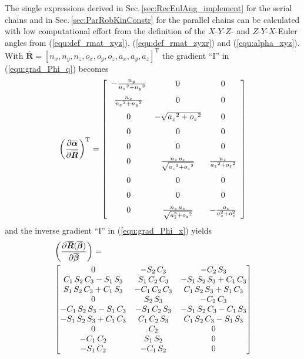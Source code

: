 \documentclass[twocolumn,10pt]{IFTOMM}
\newcommand{\bm}[1]{\boldsymbol{#1}}
\newcommand{\transp}[0]{{\mathrm{T}}}
\begin{document}
The single expressions derived in Sec.\,\ref{sec:RecEulAng_implement} for the serial chains and in Sec.\,\ref{sec:ParRobKinConstr} for the parallel chains can be calculated with low computational effort from the definition of the $X$-$Y$-$Z$- and $Z$-$Y$-$X$-Euler angles from (\ref{equ:def_rmat_xyz}), (\ref{equ:def_rmat_zyxr}) and (\ref{equ:alpha_xyz}).
With $\overline{\bm{R}}=[n_x,n_y,n_z ,o_x,o_y,o_z,a_x,a_y,a_z]^\transp$ the gradient ``I'' in (\ref{equ:grad_Phi_q}) becomes
\begin{equation}
\left(\frac{\partial \overline{\bm{\alpha}}}{\partial \overline{\bm{R}}}\right)^\transp
=
 \left[ \begin {array}{ccc} -{\frac {{n_y}}{{{n_x}}^{2}+{{n_y }}^{2}}}&0&0\\ \noalign{\medskip}{\frac {{n_x}}{{{n_x}}^{2}+{{ n_y}}^{2}}}&0&0\\ \noalign{\medskip}0&-\sqrt {{{a_z}}^{2}+{{ o_z}}^{2}}&0\\ \noalign{\medskip}0&0&0\\ \noalign{\medskip}0&0&0 \\ \noalign{\medskip}0&{\frac {{n_z}\,{o_z}}{\sqrt {{{a_z}}^{ 2}+{{o_z}}^{2}}}}&{\frac {{a_z}}{{{a_z}}^{2}+{{o_z}}^{2}}} \\ \noalign{\medskip}0&0&0\\ \noalign{\medskip}0&0&0 \\ \noalign{\medskip}0&{\frac {{n_z}\,{a_z}}{\sqrt {a_z^{2}+{{o_z}}^{2}}}}&-{\frac {o_z}{a_z^{2}+o_z^{2}} }\end {array} \right] 
\end{equation}
%
and the inverse gradient ``I'' in (\ref{equ:grad_Phi_x}) yields
%
\begin{align}
&\left(\frac{\partial \overline{\bm{R}}(\overline{\bm{\beta}})}{\partial \overline{\bm{\beta}}}\right)
=\\
\small
&\begin{bmatrix}
0&-{ S_2}\,{ C_3}&-{ C_2}\,{ S_3}
\\ { C_1}\,{ S_2}\,{ C_3}-{ S_1}\,{ S_3}&{
    S_1}\,{ C_2}\,{ C_3}&-{ S_1}\,{ S_2}\,{ S_3}+{ C_1}\,{
    C_3}\\ { S_1}\,{ S_2}\,{ C_3}+{ C_1}\,{
    S_3}&-{ C_1}\,{ C_2}\,{ C_3}&{ C_1}\,{ S_2}\,{ S_3}+{
    S_1}\,{ C_3}\\ 0&{ S_2}\,{ S_3}&-{ C_2}\,
{ C_3}\\ -{ C_1}\,{ S_2}\,{ S_3}-{ S_1}\,{
    C_3}&-{ S_1}\,{ C_2}\,{ S_3}&-{ S_1}\,{ S_2}\,{ C_3}-{
    C_1}\,{ S_3}\\ -{ S_1}\,{ S_2}\,{ S_3}+{
    C_1}\,{ C_3}&{ C_1}\,{ C_2}\,{ S_3}&{ C_1}\,{ S_2}\,{
    C_3}-{ S_1}\,{ S_3}\\ 0&{ C_2}&0
\\ -{ C_1}\,{ C_2}&{ S_1}\,{ S_2}&0
\\ -{ S_1}\,{ C_2}&-{ C_1}\,{ S_2}&0
\end {bmatrix}  \nonumber
\end{align}
\end{document}
